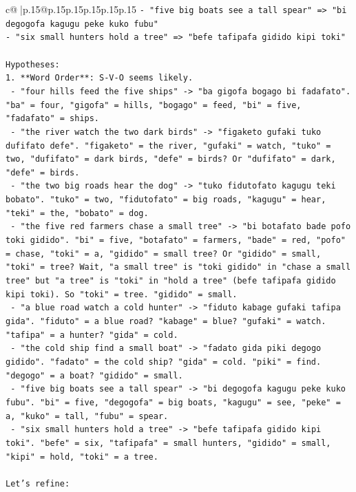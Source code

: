 \documentclass{article}
\begin{document}
{\begin{supertabular}{c@{$\;$}|p{.15\linewidth}@{}p{.15\linewidth}p{.15\linewidth}p{.15\linewidth}p{.15\linewidth}p{.15\linewidth}}
{{{\texttt{{-} "five big boats see a tall spear" => "bi degogofa kagugu peke kuko fubu"} \\
\texttt{{-} "six small hunters hold a tree" => "befe tafipafa gidido kipi toki"} \\
\\ 
\texttt{Hypotheses:} \\
\texttt{1. **Word Order**: S{-}V{-}O seems likely.} \\
\texttt{   {-} "four hills feed the five ships" {-}> "ba gigofa bogago bi fadafato". "ba" = four, "gigofa" = hills, "bogago" = feed, "bi" = five, "fadafato" = ships.} \\
\texttt{   {-} "the river watch the two dark birds" {-}> "figaketo gufaki tuko dufifato defe". "figaketo" = the river, "gufaki" = watch, "tuko" = two, "dufifato" = dark birds, "defe" = birds? Or "dufifato" = dark, "defe" = birds.} \\
\texttt{   {-} "the two big roads hear the dog" {-}> "tuko fidutofato kagugu teki bobato". "tuko" = two, "fidutofato" = big roads, "kagugu" = hear, "teki" = the, "bobato" = dog.} \\
\texttt{   {-} "the five red farmers chase a small tree" {-}> "bi botafato bade pofo toki gidido". "bi" = five, "botafato" = farmers, "bade" = red, "pofo" = chase, "toki" = a, "gidido" = small tree? Or "gidido" = small, "toki" = tree? Wait, "a small tree" is "toki gidido" in "chase a small tree" but "a tree" is "toki" in "hold a tree" (befe tafipafa gidido kipi toki). So "toki" = tree. "gidido" = small.} \\
\texttt{   {-} "a blue road watch a cold hunter" {-}> "fiduto kabage gufaki tafipa gida". "fiduto" = a blue road? "kabage" = blue? "gufaki" = watch. "tafipa" = a hunter? "gida" = cold.} \\
\texttt{   {-} "the cold ship find a small boat" {-}> "fadato gida piki degogo gidido". "fadato" = the cold ship? "gida" = cold. "piki" = find. "degogo" = a boat? "gidido" = small.} \\
\texttt{   {-} "five big boats see a tall spear" {-}> "bi degogofa kagugu peke kuko fubu". "bi" = five, "degogofa" = big boats, "kagugu" = see, "peke" = a, "kuko" = tall, "fubu" = spear.} \\
\texttt{   {-} "six small hunters hold a tree" {-}> "befe tafipafa gidido kipi toki". "befe" = six, "tafipafa" = small hunters, "gidido" = small, "kipi" = hold, "toki" = a tree.} \\
\\ 
\texttt{Let's refine:} \\
}}}
\end{supertabular}}
\end{document}
